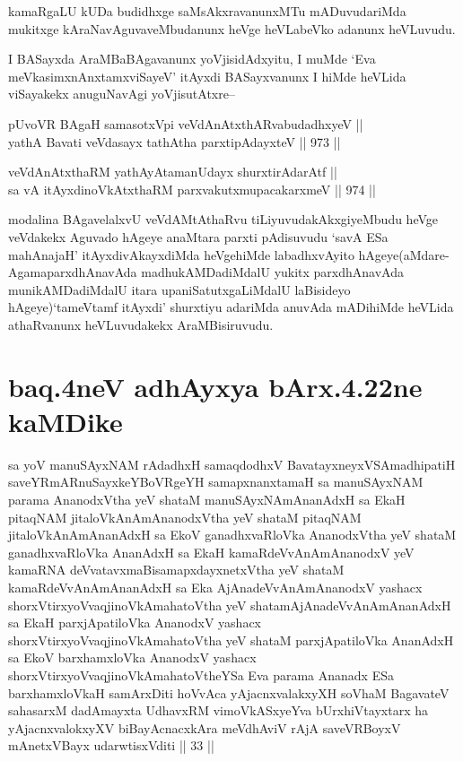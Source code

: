 \begin{artha}
kamaRgaLU kUDa budidhxge saMsAkxravanunxMTu mADuvudariMda mukitxge kAraNavAguvaveMbudanunx heVge heVLabeVko adanunx heVLuvudu.
\end{artha}

\begin{artha}
I BASayxda AraMBaBAgavanunx yoVjisidAdxyitu, I muMde `Eva meVkasimxnAnxtamxviSayeV\mdash  ' itAyxdi BASayxvanunx I hiMde heVLida viSayakekx anuguNavAgi yoVjisutAtxre{\rm --}
\end{artha}

\begin{shl}
pUvoVR BAgaH samasotxV\s pi veVdAnAtxthARvabudadhxyeV || \\
yathA Bavati veVdasayx tathA\s tha parxtipAdayxteV \hfill || 973 ||  
\end{shl}
				
\begin{shl}
veVdAnAtxthaRM yathAyAtamanUdayx shurxtirAdarAtf || \\
sa vA itAyxdinoVkAtxthaRM parxvakutxmupacakarxmeV \hfill || 974 ||  
\end{shl}


\begin{artha}
modalina BAgavelalxvU veVdAMtAthaRvu tiLiyuvudakAkxgiyeMbudu heVge veVdakekx Aguvado hAgeye anaMtara parxti pAdisuvudu `savA ESa mahAnajaH' itAyxdivAkayxdiMda heVgehiMde labadhxvAyito hAgeye(aMdare- AgamaparxdhAnavAda madhukAMDadiMdalU yukitx parxdhAnavAda munikAMDadiMdalU itara upaniSatutxgaLiMdalU laBisideyo hAgeye)`tameVtamf itAyxdi' shurxtiyu adariMda anuvAda mADihiMde heVLida athaRvanunx heVLuvudakekx AraMBisiruvudu.
\end{artha}

\section*{baq.4neV adhAyxya bArx.4.22ne kaMDike}

\begin{shl}
sa yoV manuSAyxNAM rAdadhxH samaqdodhxV BavatayxneyxVSAmadhipatiH saveYRmARnuSayxkeYBoVRgeYH samapxnanxtamaH sa manuSAyxNAM parama AnanodxV\s tha yeV shataM manuSAyxNAmAnanAdxH sa EkaH pitaqNAM jitaloVkAnAmAnanodxV\s tha yeV shataM pitaqNAM jitaloVkAnAmAnanAdxH sa EkoV ganadhxvaRloVka AnanodxV\s tha yeV shataM ganadhxvaRloVka AnanAdxH sa EkaH kamaRdeVvAnAmAnanodxV yeV kamaRNA deVvatavxmaBisamapxdayxnetxV\s tha yeV shataM kamaRdeVvAnAmAnanAdxH sa Eka AjAnadeVvAnAmAnanodxV yashacx shorxVtirxyoV\s vaqjinoV\s kAmahatoV\s tha yeV shatamAjAnadeVvAnAmAnanAdxH sa EkaH parxjApatiloVka AnanodxV yashacx shorxVtirxyoV\s vaqjinoV\s kAmahatoV\s tha yeV shataM parxjApatiloVka AnanAdxH sa EkoV barxhamxloVka AnanodxV yashacx shorxVtirxyoV\s vaqjinoV\s kAmahatoV\s theYSa Eva parama Ananadx ESa barxhamxloVkaH samArxDiti hoVvAca yAjacnxvalakxyXH soVhaM BagavateV sahasarxM dadAmayxta UdhavxRM vimoVkASxyeYva bUrxhiVtayxtarx ha yAjacnxvalokxyXV biBayAcnacxkAra meVdhAviV rAjA saveVRBoyxV mAnetxVBayx udarwtisxVditi || 33 ||
\end{shl}

